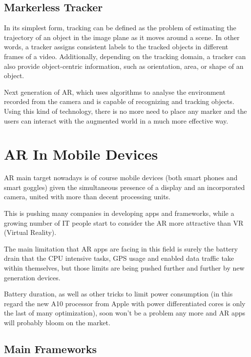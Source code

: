 		\subsection{Markerless Tracker}
			
			\begin{quoting}
				In its simplest form, tracking can be defined as the problem of estimating the trajectory of an object in the image plane as it moves around a scene. In other words, a tracker assigns consistent labels to the tracked objects in different frames of a video. Additionally, depending on the tracking domain, a tracker can also provide object-centric information, such as orientation, area, or shape of an object.~\cite{ylmaz:tracking}
			\end{quoting}
			
			Next generation of AR, which uses algorithms to analyse the environment recorded from the camera and is capable of recognizing and tracking objects. Using this kind of technology, there is no more need to place any marker and the users can interact with the augmented world in a much more effective way.
			
	
	\section{AR In Mobile Devices}
	
		AR main target nowadays is of course mobile devices (both smart phones and smart goggles) given the simultaneous presence of a display and an incorporated camera, united with more than decent processing units.
		
		This is pushing many companies in developing apps and frameworks, while a growing number of IT people start to consider the AR more attractive than VR (Virtual Reality).
		
		The main limitation that AR apps are facing in this field is surely the battery drain that the CPU intensive tasks, GPS usage and enabled data traffic take within themselves, but those limits are being pushed further and further by new generation devices.
		
		Battery duration, as well as other tricks to limit power consumption (in this regard the new A10 processor from Apple with power differentiated cores is only the last of many optimization), soon won't be a problem any more and AR apps will probably bloom on the market.
		
		\subsection{Main Frameworks}
			
